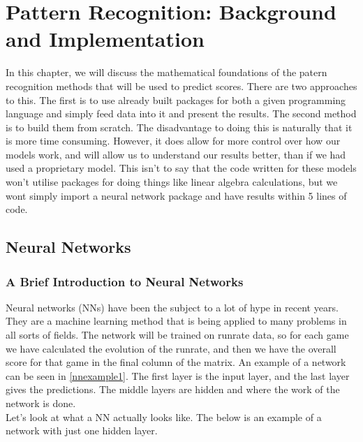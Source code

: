 \chapter{Pattern Recognition: Background and Implementation}

In this chapter, we will discuss the mathematical foundations of the patern recognition methods that will be used to predict 
scores. There are two approaches to this. The first is to use already built packages for both a given programming language and simply
feed data into it and present the results. The second method is to build them from scratch. The disadvantage to doing this is naturally 
that it is more time consuming. However, it does allow for more control over how our models work, and will allow us to understand our results
better, than if we had used a proprietary model. This isn't to say that the code written for these models won't utilise packages for doing things
like linear algebra calculations, but we wont simply import a neural network package and have results within 5 lines of code. \\



\section{Neural Networks}

\subsection{A Brief Introduction to Neural Networks}
Neural networks (NNs) have been the subject to a lot of hype in recent years. They are a machine learning method that is being applied to many problems
in all sorts of fields.  %
The network will be trained on runrate data, so for each game we have calculated the evolution of the runrate,
and then we have the overall score for that game in the final column of the matrix. An example of a network can be seen in \ref{nnexample1}. The first layer is the 
input layer, and the last layer gives the predictions. The middle layers are hidden and where the work of the network is done. \\

Let's look at what a NN actually looks like. The below is an example of a network with just one hidden layer.

